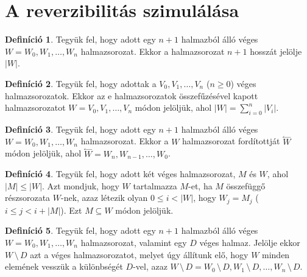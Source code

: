 \documentclass[12pt]{article}
\theoremstyle{definition}
\newtheorem*{definition*}{Definíció}
\theoremstyle{remark}
\theoremstyle{plain}
\theoremstyle{plain}
\newcommand{\backwardhat}{\overset{\leftharpoonup}}
\begin{document}
    \section*{A reverzibilitás szimulálása}

    \begin{definition*}
        Tegyük fel, hogy adott egy $n + 1$ halmazból álló véges $W=W_{0}, W_{1}, \ldots, W_{n}$ halmazsorozat. Ekkor a halmazsorozat $n + 1$ hosszát jelölje $|W|$.
    \end{definition*}

    \begin{definition*}
        Tegyük fel, hogy adottak a $V_{0}, V_{1}, \ldots, V_{n}$ ($n \geq 0$) véges halmazsorozatok. Ekkor az e halmazsorozatok összefűzésével kapott halmazsorozatot $W = V_{0}, V_{1}, \ldots, V_{n}$ módon jelöljük, ahol $|W| = \sum_{i = 0}^{n}|V_{i}|$.
    \end{definition*}

    \begin{definition*}
        Tegyük fel, hogy adott egy $n + 1$ halmazból álló véges $W=W_{0}, W_{1}, \ldots, W_{n}$ halmazsorozat. Ekkor a $W$ halmazsorozat fordítottját $\backwardhat W$ módon jelöljük, ahol $\backwardhat W = W_{n}, W_{n - 1}, \ldots, W_{0}$.
    \end{definition*}

    \begin{definition*}
        Tegyük fel, hogy adott két véges halmazsorozat, $M$ és $W$, ahol $|M| \leq |W|$. Azt mondjuk, hogy $W$ tartalmazza $M$-et, ha $M$ összefüggő részsorozata $W$-nek, azaz létezik olyan $0 \leq i < |W|$, hogy $W_{j} = M_{j}$ ($i \leq j < i + |M|$). Ezt $M \subseteq W$ módon jelöljük.
    \end{definition*}

    \begin{definition*}
        Tegyük fel, hogy adott egy $n + 1$ halmazból álló véges $W=W_{0}, W_{1}, \ldots, W_{n}$ halmazsorozat, valamint egy $D$ véges halmaz. Jelölje ekkor $W \,\setminus\, D$ azt a véges halmazsorozatot, melyet úgy állítunk elő, hogy $W$ minden elemének vesszük a különbségét $D$-vel, azaz $W \,\setminus\, D = W_{0} \,\setminus\, D, W_{1} \,\setminus\, D, \ldots, W_{n} \,\setminus\, D$.
    \end{definition*}
\end{document}
